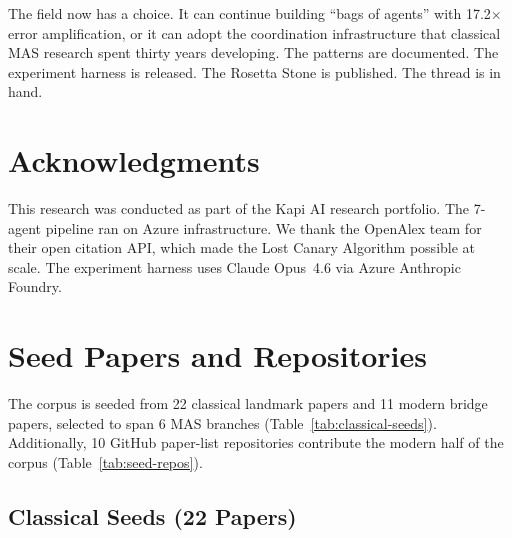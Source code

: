 \documentclass{article}
\begin{document}
The field now has a choice. It can continue building ``bags of agents'' with 17.2$\times$
error amplification, or it can adopt the coordination infrastructure that classical MAS
research spent thirty years developing. The patterns are documented. The experiment
harness is released. The Rosetta Stone is published. The thread is in hand.


\section*{Acknowledgments}

This research was conducted as part of the Kapi AI research portfolio. The 7-agent
pipeline ran on Azure infrastructure. We thank the OpenAlex team for their open
citation API, which made the Lost Canary Algorithm possible at scale. The experiment
harness uses Claude Opus~4.6 via Azure Anthropic Foundry.






\appendix

\section{Seed Papers and Repositories}
\label{app:seeds}

%
%

The corpus is seeded from 22 classical landmark papers and 11 modern bridge papers,
selected to span 6 MAS branches (Table~\ref{tab:classical-seeds}). Additionally, 10
GitHub paper-list repositories contribute the modern half of the corpus
(Table~\ref{tab:seed-repos}).

\subsection{Classical Seeds (22 Papers)}
\end{document}
